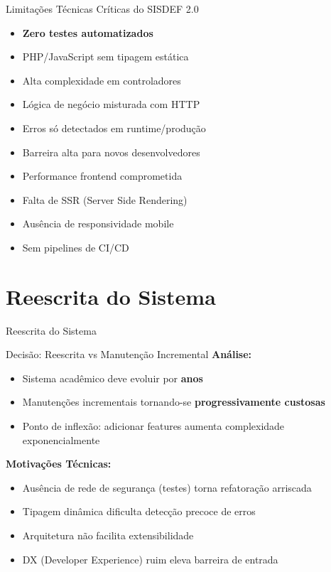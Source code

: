 \documentclass[aspectratio=169,xcolor=table]{beamer}
\begin{document}
\begin{frame}{Limitações Técnicas Críticas do SISDEF 2.0}
    \begin{itemize}
        \item  \textbf{Zero testes automatizados}
        \item  PHP/JavaScript sem tipagem estática
        \item  Alta complexidade em controladores
        \item  Lógica de negócio misturada com HTTP
        \item  Erros só detectados em runtime/produção
        \item  Barreira alta para novos desenvolvedores
        \item  Performance frontend comprometida
        \item  Falta de SSR (Server Side Rendering)
        \item  Ausência de responsividade mobile
        \item  Sem pipelines de CI/CD
    \end{itemize}
\end{frame}

\section{Reescrita do Sistema}

\begin{frame}[plain]
    \begin{center}
        \Huge Reescrita do Sistema
    \end{center}
\end{frame}

\begin{frame}{Decisão: Reescrita vs Manutenção Incremental}
    \textbf{Análise:}
    \begin{itemize}
        \item Sistema acadêmico deve evoluir por \textbf{anos}
        \item Manutenções incrementais tornando-se \textbf{progressivamente custosas}
        \item Ponto de inflexão: adicionar features aumenta complexidade exponencialmente
    \end{itemize}
    
    \vspace{0.5em}
    \textbf{Motivações Técnicas:}
    \begin{itemize}
        \item Ausência de rede de segurança (testes) torna refatoração arriscada
        \item Tipagem dinâmica dificulta detecção precoce de erros
        \item Arquitetura não facilita extensibilidade
        \item DX (Developer Experience) ruim eleva barreira de entrada
    \end{itemize}
\end{frame}
\end{document}
